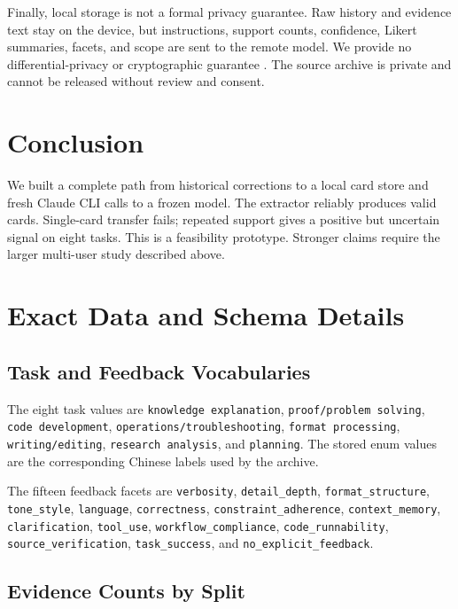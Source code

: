 \documentclass{article}
\begin{document}
Finally, local storage is not a formal privacy guarantee. Raw history and
evidence text stay on the device, but instructions, support counts, confidence,
Likert summaries, facets, and scope are sent to the remote model. We provide no
differential-privacy or cryptographic guarantee
\citep{dwork2006calibratingnt}. The source archive is private and cannot be
released without review and consent.

\section{Conclusion}

We built a complete path from historical corrections to a local card store and
fresh Claude CLI calls to a frozen model. The extractor reliably produces valid
cards. Single-card transfer fails; repeated support gives a positive but
uncertain signal on eight tasks. This is a feasibility prototype. Stronger
claims require the larger multi-user study described above.

\appendix



\section{Exact Data and Schema Details}
\label{app:data}

\subsection{Task and Feedback Vocabularies}

The eight task values are \texttt{knowledge explanation},
\texttt{proof/problem solving}, \texttt{code development},
\texttt{operations/troubleshooting}, \texttt{format processing},
\texttt{writing/editing}, \texttt{research analysis}, and
\texttt{planning}. The stored enum values are the corresponding Chinese
labels used by the archive.

The fifteen feedback facets are \texttt{verbosity},
\texttt{detail\_depth}, \texttt{format\_structure}, \texttt{tone\_style},
\texttt{language}, \texttt{correctness}, \texttt{constraint\_adherence},
\texttt{context\_memory}, \texttt{clarification}, \texttt{tool\_use},
\texttt{workflow\_compliance}, \texttt{code\_runnability},
\texttt{source\_verification}, \texttt{task\_success}, and
\texttt{no\_explicit\_feedback}.

\subsection{Evidence Counts by Split}
\end{document}
